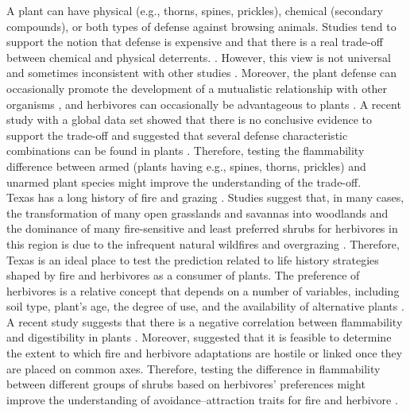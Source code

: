 \documentclass[12pt]{report}
\begin{document}
A plant can have physical (e.g., thorns, spines, prickles), chemical (secondary compounds), or both types of defense against browsing animals. Studies tend to support the notion that defense is expensive and that there is a real trade-off between chemical and physical deterrents. \citep{rhoades1979evolution, van1988defence,twigg1996physicalchemical}. However, this view is not universal and sometimes inconsistent with other studies \citep{iddles2003potentialnegativecorrelation,steward1988theredifferentview,koricheva2004metanegativecorrelation}. Moreover, the plant defense can occasionally promote the development of a mutualistic relationship with other organisms \citep{janzen1966coevolution}, and herbivores can occasionally be advantageous to plants \citep{belsky1986does}. A recent study with a global data set showed that there is no conclusive evidence to support the trade-off and suggested that several defense characteristic combinations can be found in plants \citep{moles2013correlations}. Therefore, testing the flammability difference between armed (plants having e.g., spines, thorns, prickles) and unarmed plant species might improve the understanding of the trade-off.\\

Texas has a long history of fire \citep{moir1982firehistory, stambaugh2011firehistory,stambaugh2014historicalfirehistory,smeins2005historyoffire1} and grazing \citep{buechner1950lifegrazing, wilcox2012historicalgrazing2}. Studies suggest that, in many cases, the transformation of many open grasslands and savannas into woodlands and the dominance of many fire-sensitive and least preferred shrubs for herbivores in this region is due to the infrequent natural wildfires and overgrazing \citep{archer1989havejoint,andruk2014joint, masters1986prescribed}. Therefore, Texas is an ideal place to test the prediction related to life history strategies shaped by fire and herbivores as a consumer of plants. The preference of herbivores is a relative concept that depends on a number of variables, including soil type, plant's age, the degree of use, and the availability of alternative plants \citep{wright2003white}.  A recent study suggests that there is a negative correlation between flammability and digestibility in plants \citep{gowda2022digestibility}. Moreover, \citep{archibald2019unified} suggested that it is feasible to determine the extent to which fire and herbivore adaptations are hostile or linked once they are placed on common axes. Therefore, testing the difference in flammability between different groups of shrubs based on herbivores' preferences might improve the understanding of avoidance–attraction traits for fire and herbivore \citep{schwilk2003flammability, archibald2019unified}. 
\end{document}
